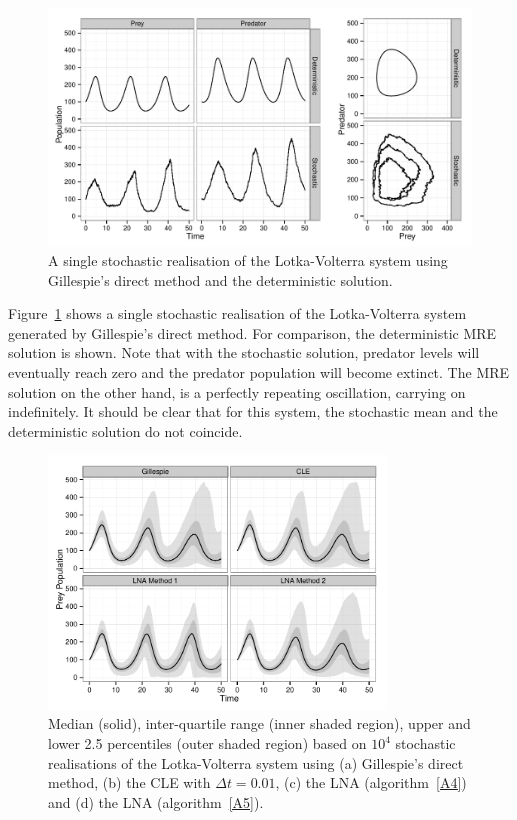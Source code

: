 \documentclass[12pt, DIV12]{scrartcl}
\begin{document}
\begin{figure}[t]
  \centering
  \includegraphics[width=\textwidth]{figure1}
  \caption{A single stochastic realisation of the Lotka-Volterra system using
    Gillespie's direct method and the deterministic solution.}\label{fig:fig1}
\end{figure}
Figure~\ref{fig:fig1} shows a single stochastic realisation of the
Lotka-Volterra system generated by Gillespie's direct method. For comparison,
the deterministic MRE solution is shown. Note that with the stochastic solution,
predator levels will eventually reach zero and the predator population will
become extinct. The MRE solution on the other hand, is a perfectly repeating
oscillation, carrying on indefinitely. It should be clear that for this system,
the stochastic mean and the deterministic solution do not coincide.

\begin{figure}[t]
  \centering
  \includegraphics[width=0.8\textwidth]{figure2}
  \caption{Median (solid), inter-quartile range (inner shaded region), upper and
    lower 2.5 percentiles (outer shaded region) based on $10^4$ stochastic
    realisations of the Lotka-Volterra system using (a) Gillespie's direct
    method, (b) the CLE with $\Delta t=0.01$, (c) the LNA (algorithm~\ref{A4}) and (d)
    the LNA (algorithm~\ref{A5}).}\label{fig:fig2}
\end{figure}
\end{document}
